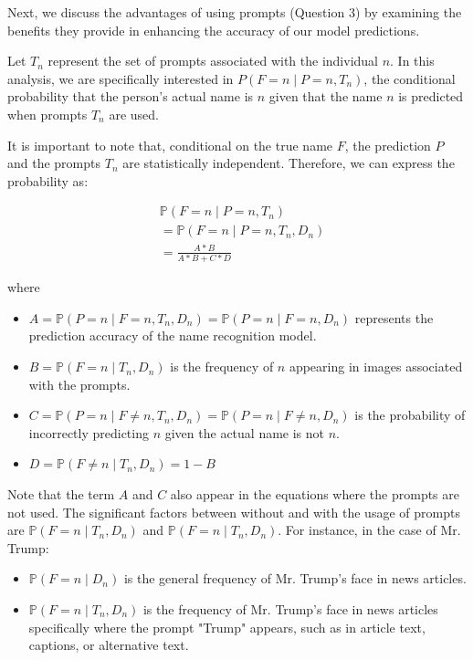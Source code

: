 \documentclass[sigconf]{acmart}
\newcommand{\Prob}[1]{\mathbb{P}\left(#1\right)}
\begin{document}
Next, we discuss the advantages of using prompts (Question 3) by examining the benefits they provide in enhancing the accuracy of our model predictions.

Let \( T_n \) represent the set of prompts associated with the individual \( n \). In this analysis, we are specifically interested in \( P(F = n \mid P = n, T_n) \), the conditional probability that the person's actual name is \( n \) given that the name \( n \) is predicted when prompts \( T_n \) are used.

It is important to note that, conditional on the true name \( F \), the prediction \( P \) and the prompts \( T_n \) are statistically independent. Therefore, we can express the probability as:

\begin{align*}
&\Prob{F = n \mid P = n, T_n}\\
&= \Prob{F = n \mid P = n, T_n, D_n} \\
&= \frac{A*B }{A*B + C*D}
\end{align*}

where 
\begin{itemize}
    \item \( A = \Prob{P = n \mid F = n, T_n, D_n} = \Prob{P = n \mid F = n, D_n} \) represents the prediction accuracy of the name recognition model.
    \item \( B = \Prob{F = n \mid T_n, D_n} \) is the frequency of \( n \) appearing in images associated with the prompts.
    \item \( C = \Prob{P = n \mid F \neq n, T_n, D_n} = \Prob{P = n \mid F \neq n, D_n} \) is the probability of incorrectly predicting \( n \) given the actual name is not \( n \).
    \item \( D = \Prob{F \neq n \mid T_n, D_n} = 1-B \)
\end{itemize}

Note that the term \(A\) and \(C\) also appear in the equations where the prompts are not used. The significant factors between without and with the usage of prompts are \(\Prob{F = n \mid T_n, D_n}\) and \(\Prob{F = n \mid T_n, D_n}\). For instance, in the case of Mr. Trump:

\begin{itemize}
    \item \(\Prob{F = n \mid D_n}\) is the general frequency of Mr. Trump’s face in news articles.
    \item \(\Prob{F = n \mid T_n, D_n}\) is the frequency of Mr. Trump’s face in news articles specifically where the prompt "Trump" appears, such as in article text, captions, or alternative text.
\end{itemize}
\end{document}
